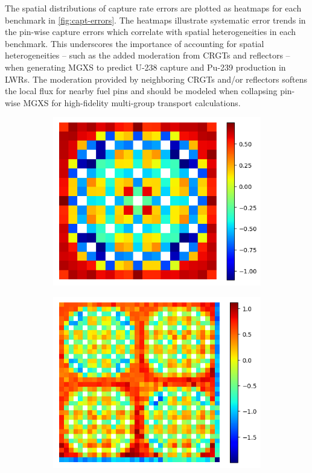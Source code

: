 The spatial distributions of capture rate errors are plotted as heatmaps for each benchmark in \autoref{fig:capt-errors}. The heatmaps illustrate systematic error trends in the pin-wise capture errors which correlate with spatial heterogeneities in each benchmark. This underscores the importance of accounting for spatial heterogeneities -- such as the added moderation from CRGTs and reflectors -- when generating MGXS to predict U-238 capture and Pu-239 production in LWRs. The moderation provided by neighboring CRGTs and/or reflectors softens the local flux for nearby fuel pins and should be modeled when collapsing pin-wise MGXS for high-fidelity multi-group transport calculations. 

\begin{figure}[h!]
\centering
\begin{subfigure}{0.45\textwidth}
  \centering
  \includegraphics[width=\linewidth]{figures/assembly/capt-single-step-errors}
  \caption{}
  \label{fig:assm-capt-single-step-error}
\end{subfigure}%
\begin{subfigure}{0.45\textwidth}
  \centering
  \includegraphics[width=\linewidth]{figures/colorset/capt-single-step-errors}

\end{subfigure}
\end{figure}
